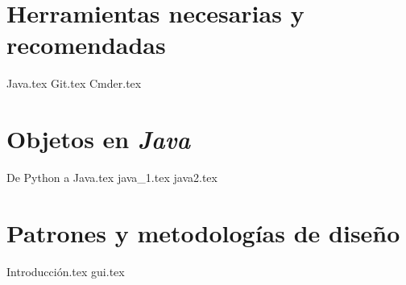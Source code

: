 \documentclass[12pt]{book}
\begin{document}
  \frontmatter
  \maketitle
  \tableofcontents
  

  \mainmatter
  \part{Herramientas necesarias y recomendadas}
    {Java.tex}
    {Git.tex}
    {Cmder.tex}
  \part{Objetos en \textit{Java}}
    
    {De Python a Java.tex}
    {java_1.tex}
    {java2.tex}
  \part{Patrones y metodologías de diseño}
    {Introducción.tex}
    {gui.tex}
\end{document}
